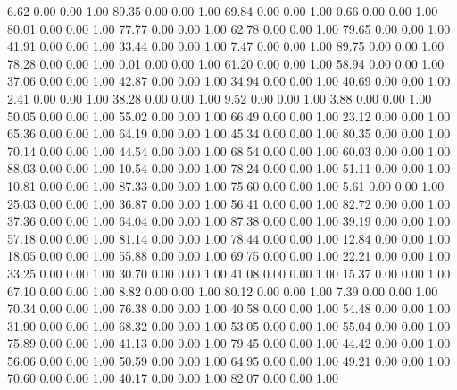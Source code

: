     6.62   0.00   0.00   1.00
   89.35   0.00   0.00   1.00
   69.84   0.00   0.00   1.00
    0.66   0.00   0.00   1.00
   80.01   0.00   0.00   1.00
   77.77   0.00   0.00   1.00
   62.78   0.00   0.00   1.00
   79.65   0.00   0.00   1.00
   41.91   0.00   0.00   1.00
   33.44   0.00   0.00   1.00
    7.47   0.00   0.00   1.00
   89.75   0.00   0.00   1.00
   78.28   0.00   0.00   1.00
    0.01   0.00   0.00   1.00
   61.20   0.00   0.00   1.00
   58.94   0.00   0.00   1.00
   37.06   0.00   0.00   1.00
   42.87   0.00   0.00   1.00
   34.94   0.00   0.00   1.00
   40.69   0.00   0.00   1.00
    2.41   0.00   0.00   1.00
   38.28   0.00   0.00   1.00
    9.52   0.00   0.00   1.00
    3.88   0.00   0.00   1.00
   50.05   0.00   0.00   1.00
   55.02   0.00   0.00   1.00
   66.49   0.00   0.00   1.00
   23.12   0.00   0.00   1.00
   65.36   0.00   0.00   1.00
   64.19   0.00   0.00   1.00
   45.34   0.00   0.00   1.00
   80.35   0.00   0.00   1.00
   70.14   0.00   0.00   1.00
   44.54   0.00   0.00   1.00
   68.54   0.00   0.00   1.00
   60.03   0.00   0.00   1.00
   88.03   0.00   0.00   1.00
   10.54   0.00   0.00   1.00
   78.24   0.00   0.00   1.00
   51.11   0.00   0.00   1.00
   10.81   0.00   0.00   1.00
   87.33   0.00   0.00   1.00
   75.60   0.00   0.00   1.00
    5.61   0.00   0.00   1.00
   25.03   0.00   0.00   1.00
   36.87   0.00   0.00   1.00
   56.41   0.00   0.00   1.00
   82.72   0.00   0.00   1.00
   37.36   0.00   0.00   1.00
   64.04   0.00   0.00   1.00
   87.38   0.00   0.00   1.00
   39.19   0.00   0.00   1.00
   57.18   0.00   0.00   1.00
   81.14   0.00   0.00   1.00
   78.44   0.00   0.00   1.00
   12.84   0.00   0.00   1.00
   18.05   0.00   0.00   1.00
   55.88   0.00   0.00   1.00
   69.75   0.00   0.00   1.00
   22.21   0.00   0.00   1.00
   33.25   0.00   0.00   1.00
   30.70   0.00   0.00   1.00
   41.08   0.00   0.00   1.00
   15.37   0.00   0.00   1.00
   67.10   0.00   0.00   1.00
    8.82   0.00   0.00   1.00
   80.12   0.00   0.00   1.00
    7.39   0.00   0.00   1.00
   70.34   0.00   0.00   1.00
   76.38   0.00   0.00   1.00
   40.58   0.00   0.00   1.00
   54.48   0.00   0.00   1.00
   31.90   0.00   0.00   1.00
   68.32   0.00   0.00   1.00
   53.05   0.00   0.00   1.00
   55.04   0.00   0.00   1.00
   75.89   0.00   0.00   1.00
   41.13   0.00   0.00   1.00
   79.45   0.00   0.00   1.00
   44.42   0.00   0.00   1.00
   56.06   0.00   0.00   1.00
   50.59   0.00   0.00   1.00
   64.95   0.00   0.00   1.00
   49.21   0.00   0.00   1.00
   70.60   0.00   0.00   1.00
   40.17   0.00   0.00   1.00
   82.07   0.00   0.00   1.00
